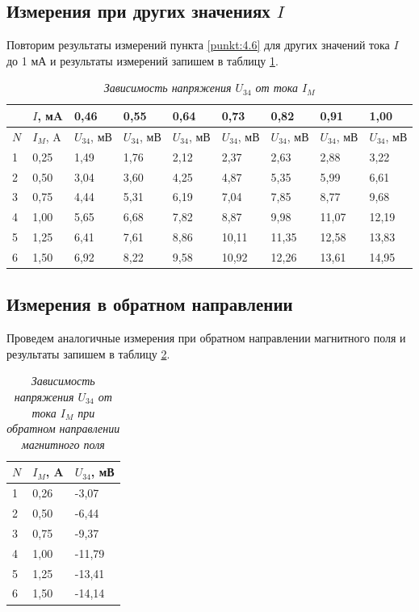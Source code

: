 \documentclass[a4paper,12pt]{article}
\begin{document}
\subsection{Измерения при других значениях $I$}

Повторим результаты измерений пункта \ref{punkt:4.6} для других значений тока $I$ до 1 мА и результаты измерений запишем в таблицу \ref{table:3}.

\begin{table}[!ht]
    \centering
    \begin{tabular}{|l|l|l|l|l|l|l|l|l|}
    \hline
        ~ & $I$, мA & 0,46 & 0,55 & 0,64 & 0,73 & 0,82 & 0,91 & 1,00 \\ \hline
        $N$ & $I_M$, A & $U_{34}$, мВ & $U_{34}$, мВ & $U_{34}$, мВ & $U_{34}$, мВ & $U_{34}$, мВ & $U_{34}$, мВ & $U_{34}$, мВ \\ \hline
        1 & 0,25 & 1,49 & 1,76 & 2,12 & 2,37 & 2,63 & 2,88 & 3,22 \\ \hline
        2 & 0,50 & 3,04 & 3,60 & 4,25 & 4,87 & 5,35 & 5,99 & 6,61 \\ \hline
        3 & 0,75 & 4,44 & 5,31 & 6,19 & 7,04 & 7,85 & 8,77 & 9,68 \\ \hline
        4 & 1,00 & 5,65 & 6,68 & 7,82 & 8,87 & 9,98 & 11,07 & 12,19 \\ \hline
        5 & 1,25 & 6,41 & 7,61 & 8,86 & 10,11 & 11,35 & 12,58 & 13,83 \\ \hline
        6 & 1,50 & 6,92 & 8,22 & 9,58 & 10,92 & 12,26 & 13,61 & 14,95 \\ \hline
    \end{tabular}\caption{\textit{Зависимость напряжения $U_{34}$ от тока $I_M$}}\label{table:3}
\end{table}

\subsection{Измерения в обратном направлении}

Проведем аналогичные измерения при обратном направлении магнитного поля и результаты запишем в таблицу \ref{table:4}.

\begin{table}[!ht]
    \centering
    \begin{tabular}{|l|l|l|}
    \hline
        $N$ & $I_M$, A & $U_{34}$, мВ \\ \hline
        1 & 0,26 & -3,07 \\ \hline
        2 & 0,50 & -6,44 \\ \hline
        3 & 0,75 & -9,37 \\ \hline
        4 & 1,00 & -11,79 \\ \hline
        5 & 1,25 & -13,41 \\ \hline
        6 & 1,50 & -14,14 \\ \hline
    \end{tabular}\caption{\textit{Зависимость напряжения $U_{34}$ от тока $I_M$ при обратном направлении магнитного поля}}\label{table:4}
\end{table}
\end{document}
